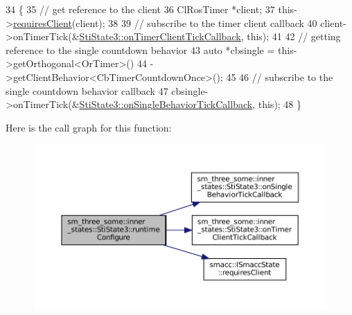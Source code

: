 \begin{DoxyCode}
34   \{
35     \textcolor{comment}{// get reference to the client}
36     ClRosTimer *client;
37     this->\hyperlink{classsmacc_1_1ISmaccState_a7f95c9f0a6ea2d6f18d1aec0519de4ac}{requiresClient}(client);
38 
39     \textcolor{comment}{// subscribe to the timer client callback}
40     client->onTimerTick(&\hyperlink{structsm__three__some_1_1inner__states_1_1StiState3_aa9e626e093269683522ed582db1c6bd6}{StiState3::onTimerClientTickCallback}, \textcolor{keyword}{this});
41 
42     \textcolor{comment}{// getting reference to the single countdown behavior}
43     \textcolor{keyword}{auto} *cbsingle = this->getOrthogonal<OrTimer>()
44                           ->getClientBehavior<CbTimerCountdownOnce>();
45 
46     \textcolor{comment}{// subscribe to the single countdown behavior callback}
47     cbsingle->onTimerTick(&\hyperlink{structsm__three__some_1_1inner__states_1_1StiState3_a1e26bb6a2e91c1b2a448bd29a50ecaaa}{StiState3::onSingleBehaviorTickCallback}, \textcolor{keyword}{
      this});
48   \}
\end{DoxyCode}
Here is the call graph for this function\+:
\nopagebreak
\begin{figure}[H]
\begin{center}
\leavevmode
\includegraphics[width=350pt]{structsm__three__some_1_1inner__states_1_1StiState3_aec16c13bf440af18f898274110e97786_cgraph}
\end{center}
\end{figure}
\mbox{\label{structsm__three__some_1_1inner__states_1_1StiState3_a029d93f83c53d16ac347d908dbe87cc2}} 
